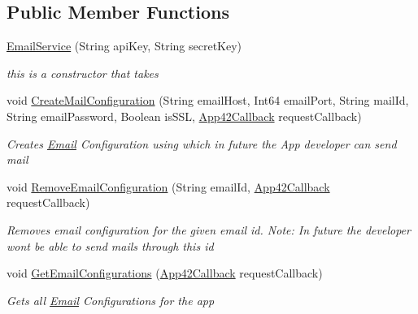 \subsection*{Public Member Functions}
\begin{DoxyCompactItemize}
\item 
\hyperlink{classcom_1_1shephertz_1_1app42_1_1paas_1_1sdk_1_1windows_1_1email_1_1_email_service_ab587a41eda045d4c09f8801fce43b8ac}{Email\+Service} (String api\+Key, String secret\+Key)
\begin{DoxyCompactList}\small\item\em this is a constructor that takes \end{DoxyCompactList}\item 
void \hyperlink{classcom_1_1shephertz_1_1app42_1_1paas_1_1sdk_1_1windows_1_1email_1_1_email_service_a06b128f67740bb5f5f833a3531e793e9}{Create\+Mail\+Configuration} (String email\+Host, Int64 email\+Port, String mail\+Id, String email\+Password, Boolean is\+S\+S\+L, \hyperlink{interfacecom_1_1shephertz_1_1app42_1_1paas_1_1sdk_1_1windows_1_1_app42_callback}{App42\+Callback} request\+Callback)
\begin{DoxyCompactList}\small\item\em Creates \hyperlink{classcom_1_1shephertz_1_1app42_1_1paas_1_1sdk_1_1windows_1_1email_1_1_email}{Email} Configuration using which in future the App developer can send mail \end{DoxyCompactList}\item 
void \hyperlink{classcom_1_1shephertz_1_1app42_1_1paas_1_1sdk_1_1windows_1_1email_1_1_email_service_a51d2106ef3d934cf3a53e90ce985d1fe}{Remove\+Email\+Configuration} (String email\+Id, \hyperlink{interfacecom_1_1shephertz_1_1app42_1_1paas_1_1sdk_1_1windows_1_1_app42_callback}{App42\+Callback} request\+Callback)
\begin{DoxyCompactList}\small\item\em Removes email configuration for the given email id. Note\+: In future the developer wont be able to send mails through this id \end{DoxyCompactList}\item 
void \hyperlink{classcom_1_1shephertz_1_1app42_1_1paas_1_1sdk_1_1windows_1_1email_1_1_email_service_aeb103b03afaa9504c1253d960dee50fa}{Get\+Email\+Configurations} (\hyperlink{interfacecom_1_1shephertz_1_1app42_1_1paas_1_1sdk_1_1windows_1_1_app42_callback}{App42\+Callback} request\+Callback)
\begin{DoxyCompactList}\small\item\em Gets all \hyperlink{classcom_1_1shephertz_1_1app42_1_1paas_1_1sdk_1_1windows_1_1email_1_1_email}{Email} Configurations for the app \end{DoxyCompactList}\item 

\end{DoxyCompactItemize}
